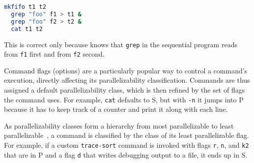 \documentclass[letterpaper,twocolumn,10pt]{article}
\newcommand{\heading}[1]{\vspace{4pt}\noindent\textbf{#1}\enspace}
\newcommand{\ttt}[1]{\texttt{#1}}
\newcommand{\cn}[1]{\mbox{\textcircled{\footnotesize #1}}}
\newcommand{\sta}{\cn{\textsc{S}}\xspace}
\newcommand{\pur}{\cn{\textsc{P}}\xspace}
\begin{document}
\begin{lstlisting}[language=sh, numbers=none]
  mkfifo t1 t2
  grep "foo" f1 > t1 &
  grep "foo" f2 > t2 &
  cat t1 t2
\end{lstlisting}

\noindent
This is correct only because \sys knows that \ttt{grep} in the sequential program reads from \ttt{f1} first and from \ttt{f2} second.

Command flags (options) are a particularly popular way to control a command's execution, directly affecting its parallelizability classification.
Commands are thus assigned a default parallelizability class, which is then refined by the set of flags the command uses.
For example, \ttt{cat} defaults to \sta, but with \ttt{-n} it jumps into \pur because it has to keep track of a counter and print it along with each line.

As parallelizability classes form a hierarchy from most parallelizable to least parallelizable~, a command is classified by the class of its least parallelizable flag.
For example, if a custom \ttt{trace-sort} command is invoked with flags \ttt{r}, \ttt{n}, and \ttt{k2} that are in \pur and a flag \ttt{d} that writes debugging output to a file, it ends up in \sta.





\end{document}
